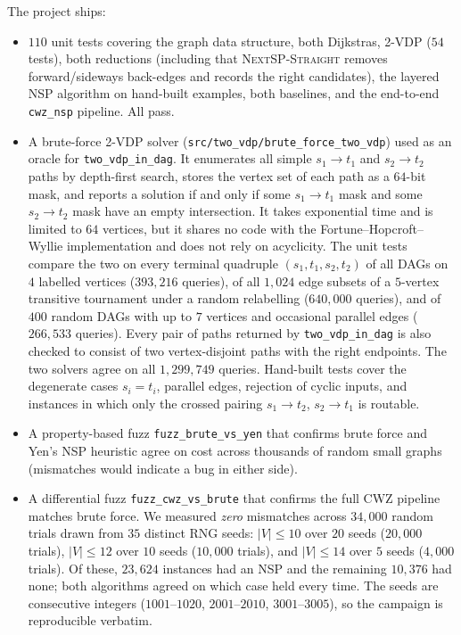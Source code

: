 The project ships:
\begin{itemize}
  \item $110$ unit tests covering the graph data structure, both
    Dijkstras, 2-VDP ($54$ tests), both
    reductions (including that \textsc{NextSP-Straight} removes
    forward/sideways back-edges and records the right candidates), the
    layered NSP algorithm on hand-built examples, both baselines, and
    the end-to-end \texttt{cwz\_nsp} pipeline. All pass.
  \item A brute-force 2-VDP solver
    (\texttt{src/two\_vdp/brute\_force\_two\_vdp}) used as an oracle for
    \texttt{two\_vdp\_in\_dag}. It enumerates all simple $s_1\to t_1$
    and $s_2\to t_2$ paths by depth-first search, stores the vertex set
    of each path as a $64$-bit mask, and reports a solution if and only
    if some $s_1\to t_1$ mask and some $s_2\to t_2$ mask have an empty
    intersection. It takes exponential time and is limited to $64$
    vertices, but it shares no code with the Fortune--Hopcroft--Wyllie
    implementation and does not rely on acyclicity. The unit tests
    compare the two on every terminal quadruple $(s_1,t_1,s_2,t_2)$ of
    all DAGs on $4$ labelled vertices ($393{,}216$ queries), of all
    $1{,}024$ edge subsets of a $5$-vertex transitive tournament under a
    random relabelling ($640{,}000$ queries), and of $400$ random DAGs
    with up to $7$ vertices and occasional parallel edges ($266{,}533$
    queries). Every pair of paths returned by \texttt{two\_vdp\_in\_dag}
    is also checked to consist of two vertex-disjoint paths with the
    right endpoints. The two solvers agree on all $1{,}299{,}749$
    queries. Hand-built tests cover the degenerate cases $s_i=t_i$,
    parallel edges, rejection of cyclic inputs, and instances in which
    only the crossed pairing $s_1\to t_2$, $s_2\to t_1$ is routable.
  \item A property-based fuzz \texttt{fuzz\_brute\_vs\_yen} that
    confirms brute force and Yen's NSP heuristic agree on cost across
    thousands of random small graphs (mismatches would indicate a bug
    in either side).
  \item A differential fuzz \texttt{fuzz\_cwz\_vs\_brute} that confirms
    the full CWZ pipeline matches brute force. We measured \emph{zero}
    mismatches across $34{,}000$ random trials drawn from $35$ distinct
    RNG seeds: $|V|\le 10$ over $20$ seeds ($20{,}000$ trials),
    $|V|\le 12$ over $10$ seeds ($10{,}000$ trials), and $|V|\le 14$
    over $5$ seeds ($4{,}000$ trials). Of these, $23{,}624$ instances
    had an NSP and the remaining $10{,}376$ had none; both algorithms
    agreed on which case held every time. The seeds are consecutive
    integers ($1001$--$1020$, $2001$--$2010$, $3001$--$3005$), so the
    campaign is reproducible verbatim.
\end{itemize}

